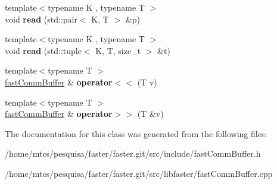 \begin{DoxyCompactItemize}
{\footnotesize template$<$typename K , typename T $>$ }\\void {\bfseries read} (std\+::pair$<$ K, T $>$ \&p)
\item 
\hypertarget{classfaster_1_1fastCommBuffer_afe0968b6a32dbafdd87639262e21ea0f}{}\label{classfaster_1_1fastCommBuffer_afe0968b6a32dbafdd87639262e21ea0f} 
{\footnotesize template$<$typename K , typename T $>$ }\\void {\bfseries read} (std\+::tuple$<$ K, T, size\+\_\+t $>$ \&t)
\item 
\hypertarget{classfaster_1_1fastCommBuffer_a0b4e973082ad897d135a5a454a06623f}{}\label{classfaster_1_1fastCommBuffer_a0b4e973082ad897d135a5a454a06623f} 
{\footnotesize template$<$typename T $>$ }\\\hyperlink{classfaster_1_1fastCommBuffer}{fast\+Comm\+Buffer} \& {\bfseries operator$<$$<$} (T v)
\item 
\hypertarget{classfaster_1_1fastCommBuffer_a957e261de1a95762b9730a0322f5d341}{}\label{classfaster_1_1fastCommBuffer_a957e261de1a95762b9730a0322f5d341} 
{\footnotesize template$<$typename T $>$ }\\\hyperlink{classfaster_1_1fastCommBuffer}{fast\+Comm\+Buffer} \& {\bfseries operator$>$$>$} (T \&v)
\end{DoxyCompactItemize}


The documentation for this class was generated from the following files\+:\begin{DoxyCompactItemize}
\item 
/home/mtcs/pesquisa/faster/faster.\+git/src/include/fast\+Comm\+Buffer.\+h\item 
/home/mtcs/pesquisa/faster/faster.\+git/src/libfaster/fast\+Comm\+Buffer.\+cpp\end{DoxyCompactItemize}
